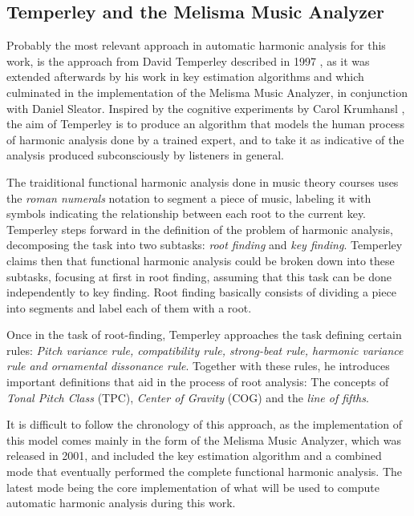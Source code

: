     \subsection{Temperley and the Melisma Music Analyzer}
    Probably the most relevant approach in automatic harmonic analysis for this work, is the approach from David Temperley described in 1997 \cite{temperley1997algorithm}, as it was extended afterwards by his work in key estimation algorithms and which culminated in the implementation of the Melisma Music Analyzer, in conjunction with Daniel Sleator.
    Inspired by the cognitive experiments by Carol Krumhansl \cite{krumhansl2001cognitive}, the aim of Temperley is to produce an algorithm that models the human process of harmonic analysis done by a trained expert, and to take it as indicative of the analysis produced subconsciously by listeners in general.

		The traiditional functional harmonic analysis done in music theory courses uses the \emph{roman numerals} notation to segment a piece of music, labeling it with symbols indicating the relationship between each root to the current key. Temperley steps forward in the definition of the problem of harmonic analysis, decomposing the task into two subtasks: \emph{root finding} and \emph{key finding}. Temperley claims then that functional harmonic analysis could be broken down into these subtasks, focusing at first in root finding, assuming that this task can be done independently to key finding. Root finding basically consists of dividing a piece into segments and label each of them with a root.

    Once in the task of root-finding, Temperley approaches the task defining certain rules: \emph{Pitch variance rule, compatibility rule, strong-beat rule, harmonic variance rule and ornamental dissonance rule}. Together with these rules, he introduces important definitions that aid in the process of root analysis: The concepts of \emph{Tonal Pitch Class} (TPC), \emph{Center of Gravity} (COG) and the \emph{line of fifths}.

    It is difficult to follow the chronology of this approach, as the implementation of this model comes mainly in the form of the Melisma Music Analyzer, which was released in 2001, and included the key estimation algorithm and a combined mode that eventually performed the complete functional harmonic analysis. The latest mode being the core implementation of what will be used to compute automatic harmonic analysis during this work.

